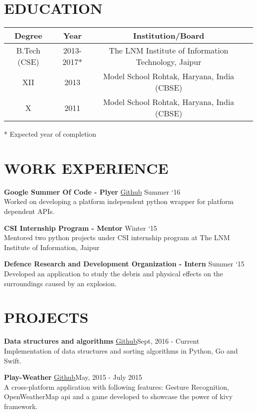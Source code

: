 \documentclass[margin]{res}
\begin{document}
\begin{resume}

\section{EDUCATION}

\begin{tabular}{|c|c|c|c|}

\hline
\textbf{Degree} & \textbf{Year} & {Institution/Board} \\
\hline
B.Tech (CSE) & 2013-2017* & The LNM Institute of Information Technology, Jaipur \\
\hline
XII & 2013 & Model School Rohtak, Haryana, India (CBSE) \\
\hline
X & 2011 & Model School Rohtak, Haryana, India (CBSE) \\
\hline
\end{tabular}
* Expected year of completion

\section{WORK EXPERIENCE}
\textbf{Google Summer Of Code - Plyer}   \href{https://github.com/kiok46/plyer}{Github} \hfill Summer `16 \\
Worked on developing a platform independent python wrapper for platform dependent APIs.

\textbf{CSI Internship Program - Mentor} \hfill Winter `15 \\
Mentored two python projects under CSI internship program at The LNM Institute of Information, Jaipur

\textbf{Defence Research and Development Organization - Intern} \hfill Summer `15 \\
Developed an application to study the debris and physical effects on the surroundings caused by an explosion.

\section{PROJECTS}

    {\textbf{Data structures and algorithms} \href{https://github.com/kiok46/Go-Python-Swift-data-structures-and-sorting}{ Github}\hfill Sept, 2016 - Current \\
    Implementation of data structures and sorting algorithms in Python, Go and Swift.
    
    {\textbf{Play-Weather} \href{https://github.com/kiok46/Play-Weather}{ Github}\hfill May, 2015 - July 2015 \\
    A cross-platform application with following features: Gesture Recognition, OpenWeatherMap api and a game developed to showcase the power of kivy framework.
    


}}
\end{resume}
\end{document}
